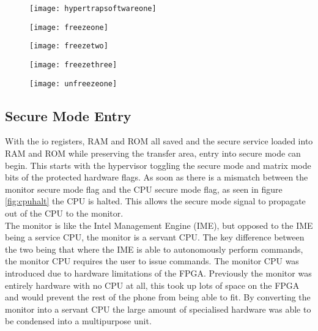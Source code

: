 \begin{figure}
  \centering
  \texttt{[image: hypertrapsoftwareone]}
  \caption{}
  \label{fig:hypertrapsoftwareone}
\end{figure}

\begin{figure}
  \centering
  \texttt{[image: freezeone]}
  \caption{}
  \label{fig:freezeone}
\end{figure}

\begin{figure}
  \centering
  \texttt{[image: freezetwo]}
  \caption{}
  \label{fig:freezetwo}
\end{figure}

\begin{figure}
  \centering
  \texttt{[image: freezethree]}
  \caption{}
  \label{fig:freezethree}
\end{figure}

\begin{figure}
  \centering
  \texttt{[image: unfreezeone]}
  \caption{}
  \label{fig:unfreezeone}
\end{figure}


\subsection{Secure Mode Entry}

\label{Ch6 Sec3 Sub3}

With the io registers, RAM and ROM all saved and the secure service loaded into RAM and ROM while preserving the transfer area, entry into secure mode can begin. This starts with the hypervisor toggling the secure mode and matrix mode bits of the protected hardware flags. As soon as there is a mismatch between the monitor secure mode flag and the CPU secure mode flag, as seen in figure \ref{fig:cpuhalt} the CPU is halted. This allows the secure mode signal to propagate out of the CPU to the monitor.\\

The monitor is like the Intel Management Engine (IME), but opposed to the IME being a service CPU, the monitor is a servant CPU. The key difference between the two being that where the IME is able to autonomously perform commands, the monitor CPU requires the user to issue commands. The monitor CPU was introduced due to hardware limitations of the FPGA. Previously the monitor was entirely hardware with no CPU at all, this took up lots of space on the FPGA and would prevent the rest of the phone from being able to fit. By converting the monitor into a servant CPU the large amount of specialised hardware was able to be condensed into a multipurpose unit.\\


